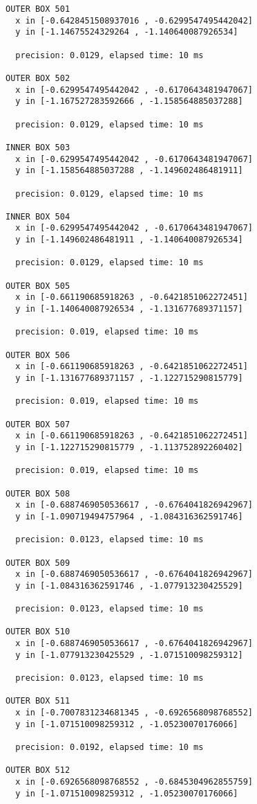 \begin{verbatim}
OUTER BOX 501
  x in [-0.6428451508937016 , -0.6299547495442042]
  y in [-1.14675524329264 , -1.140640087926534]

  precision: 0.0129, elapsed time: 10 ms

OUTER BOX 502
  x in [-0.6299547495442042 , -0.6170643481947067]
  y in [-1.167527283592666 , -1.158564885037288]

  precision: 0.0129, elapsed time: 10 ms

INNER BOX 503
  x in [-0.6299547495442042 , -0.6170643481947067]
  y in [-1.158564885037288 , -1.149602486481911]

  precision: 0.0129, elapsed time: 10 ms

INNER BOX 504
  x in [-0.6299547495442042 , -0.6170643481947067]
  y in [-1.149602486481911 , -1.140640087926534]

  precision: 0.0129, elapsed time: 10 ms

OUTER BOX 505
  x in [-0.661190685918263 , -0.6421851062272451]
  y in [-1.140640087926534 , -1.131677689371157]

  precision: 0.019, elapsed time: 10 ms

OUTER BOX 506
  x in [-0.661190685918263 , -0.6421851062272451]
  y in [-1.131677689371157 , -1.122715290815779]

  precision: 0.019, elapsed time: 10 ms

OUTER BOX 507
  x in [-0.661190685918263 , -0.6421851062272451]
  y in [-1.122715290815779 , -1.113752892260402]

  precision: 0.019, elapsed time: 10 ms

OUTER BOX 508
  x in [-0.6887469050536617 , -0.6764041826942967]
  y in [-1.090719494757964 , -1.084316362591746]

  precision: 0.0123, elapsed time: 10 ms

OUTER BOX 509
  x in [-0.6887469050536617 , -0.6764041826942967]
  y in [-1.084316362591746 , -1.077913230425529]

  precision: 0.0123, elapsed time: 10 ms

OUTER BOX 510
  x in [-0.6887469050536617 , -0.6764041826942967]
  y in [-1.077913230425529 , -1.071510098259312]

  precision: 0.0123, elapsed time: 10 ms

OUTER BOX 511
  x in [-0.7007831234681345 , -0.6926568098768552]
  y in [-1.071510098259312 , -1.05230070176066]

  precision: 0.0192, elapsed time: 10 ms

OUTER BOX 512
  x in [-0.6926568098768552 , -0.6845304962855759]
  y in [-1.071510098259312 , -1.05230070176066]


\end{verbatim}
